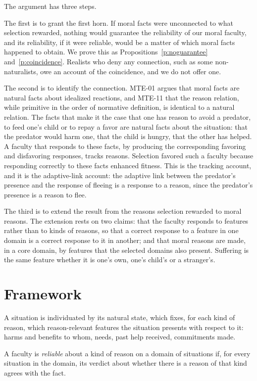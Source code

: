 \documentclass{situationist-preprint}
\begin{document}
The argument has three steps.

The first is to grant the first horn. If moral facts were unconnected to what selection rewarded, nothing would guarantee the reliability of our moral faculty, and its reliability, if it were reliable, would be a matter of which moral facts happened to obtain. We prove this as Propositions~\ref{p:noguarantee} and~\ref{p:coincidence}. Realists who deny any connection, such as some non-naturalists, owe an account of the coincidence, and we do not offer one.

The second is to identify the connection. MTE-01 argues that moral facts are natural facts about idealized reactions, and MTE-11 that the reason relation, while primitive in the order of normative definition, is identical to a natural relation. The facts that make it the case that one has reason to avoid a predator, to feed one's child or to repay a favor are natural facts about the situation: that the predator would harm one, that the child is hungry, that the other has helped. A faculty that responds to these facts, by producing the corresponding favoring and disfavoring responses, tracks reasons. Selection favored such a faculty because responding correctly to these facts enhanced fitness. This is the tracking account, and it is the adaptive-link account: the adaptive link between the predator's presence and the response of fleeing is a response to a reason, since the predator's presence is a reason to flee.

The third is to extend the result from the reasons selection rewarded to moral reasons. The extension rests on two claims: that the faculty responds to features rather than to kinds of reasons, so that a correct response to a feature in one domain is a correct response to it in another; and that moral reasons are made, in a core domain, by features that the selected domains also present. Suffering is the same feature whether it is one's own, one's child's or a stranger's.

\section{Framework}

A situation is individuated by its natural state, which fixes, for each kind of reason, which reason-relevant features the situation presents with respect to it: harms and benefits to whom, needs, past help received, commitments made.

\begin{definition}[Reliability]\label{d:rel}
A faculty is \emph{reliable} about a kind of reason on a domain of situations if, for every situation in the domain, its verdict about whether there is a reason of that kind agrees with the fact.
\end{definition}
\end{document}
